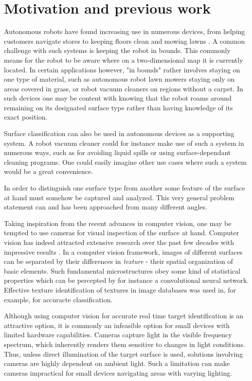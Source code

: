 \section{Motivation and previous work}

Autonomous robots have found increasing use in numerous devices, from helping customers navigate stores \citep{mcsweeney_2018} to keeping floors clean \citep{sanfacon_2017} and mowing lawns \citep{udelhofen_2018}. A common challenge with such systems is keeping the robot in bounds. This commonly means for the robot to be aware where on a two-dimensional map it is currently located. In certain applications however, "in bounds" rather involves staying on one type of material, such as autonomous robot lawn mowers staying only on areas covered in grass, or robot vacuum cleaners on regions without a carpet. In such devices one may be content with knowing that the robot roams around remaining on its designated surface type rather than having knowledge of its exact position. 

Surface classification can also be used in autonomous devices as a supporting system. A robot vacuum cleaner could for instance make use of such a system in numerous ways, such as for avoiding liquid spills or using surface-dependant cleaning programs. One could easily imagine other use cases where such a system would be a great convenience.

In order to distinguish one surface type from another some feature of the surface at hand must somehow be captured and analyzed. This very general problem statement can and has been approached from many different angles.

Taking inspiration from the recent advances in computer vision, one may be tempted to use cameras for visual inspection of the surface at hand. Computer vision has indeed attracted extensive research over the past few decades with impressive results \citep{liu_chen_fieguth_zhao_chellappa_pietikäinen_2018}. In a computer vision framework, images of different surfaces can be separated by their differences in \emph{texture} - their spatial organization of basic elements. Such fundamental microstructures obey some kind of statistical properties which can be percepted by for instance a convolutional neural network. Effective texture identification of textures in image databases was used in, for example, \citep{do_vetterli_2002} for accuracte classification. 

Although using computer vision for accurate real time target identification is an attractive option, it is commonly an infeasible option for small devices with limited hardware capabilities. Cameras capture light in the visible frequency spectrum, which inherently renders them sensitive to changes in light conditions. Thus, unless direct illumination of the target surface is used, solutions involving cameras are highly dependent on ambient light. Such a limitation can make cameras impractical for small devices navigating areas with varying lighting.

